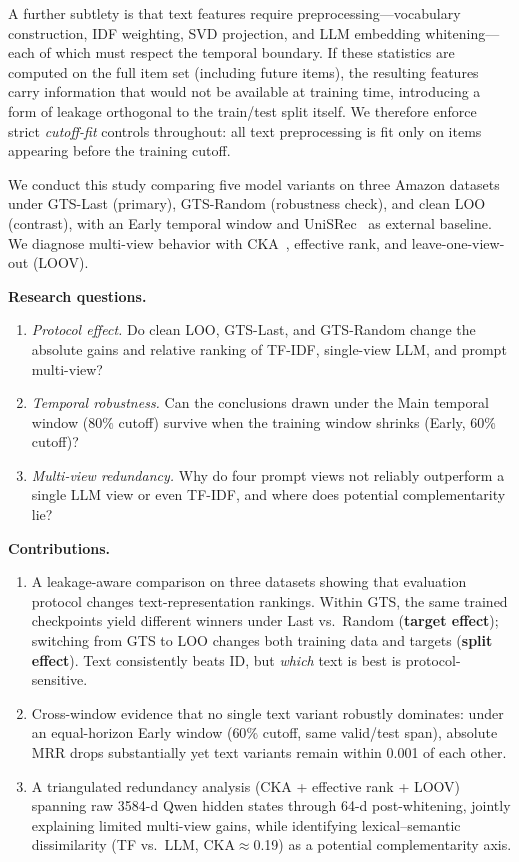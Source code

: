 \documentclass[sigconf,natbib=true,anonymous]{acmart}
\newcommand{\tfidf}{\textsc{TF-IDF}\xspace}
\newcommand{\llm}{\textsc{LLM}\xspace}
\begin{document}
A further subtlety is that text features require preprocessing---vocabulary construction, IDF weighting, SVD projection, and LLM embedding whitening---each of which must respect the temporal boundary.
If these statistics are computed on the full item set (including future items), the resulting features carry information that would not be available at training time, introducing a form of leakage orthogonal to the train/test split itself.
We therefore enforce strict \emph{cutoff-fit} controls throughout: all text preprocessing is fit only on items appearing before the training cutoff.

We conduct this study comparing five model variants on three Amazon datasets under GTS-Last (primary), GTS-Random (robustness check), and clean LOO (contrast), with an Early temporal window and UniSRec~\cite{hou2022unisrec} as external baseline.
We diagnose multi-view behavior with CKA~\cite{kornblith2019cka}, effective rank, and leave-one-view-out (LOOV).

\smallskip\noindent\textbf{Research questions.}
\begin{enumerate}[leftmargin=*,itemsep=1pt]
\item[\textbf{RQ1}] \emph{Protocol effect.}
Do clean LOO, GTS-Last, and GTS-Random change the absolute gains and relative ranking of \tfidf, single-view \llm, and prompt multi-view?
\item[\textbf{RQ2}] \emph{Temporal robustness.}
Can the conclusions drawn under the Main temporal window ($80\%$ cutoff) survive when the training window shrinks (Early, $60\%$ cutoff)?
\item[\textbf{RQ3}] \emph{Multi-view redundancy.}
Why do four prompt views not reliably outperform a single \llm view or even \tfidf, and where does potential complementarity lie?
\end{enumerate}

\smallskip\noindent\textbf{Contributions.}
\begin{enumerate}[leftmargin=*,itemsep=1pt]
\item A leakage-aware comparison on three datasets showing that evaluation protocol changes text-representation rankings.  Within GTS, the same trained checkpoints yield different winners under Last vs.\ Random (\textbf{target effect}); switching from GTS to LOO changes both training data and targets (\textbf{split effect}).  Text consistently beats ID, but \emph{which} text is best is protocol-sensitive.
\item Cross-window evidence that no single text variant robustly dominates: under an equal-horizon Early window ($60\%$ cutoff, same valid/test span), absolute MRR drops substantially yet text variants remain within 0.001 of each other.
\item A triangulated redundancy analysis (CKA + effective rank + LOOV) spanning raw 3584-d Qwen hidden states through 64-d post-whitening, jointly explaining limited multi-view gains, while identifying lexical--semantic dissimilarity (TF vs.\ LLM, CKA$\approx$0.19) as a potential complementarity axis.
\end{enumerate}
\end{document}
